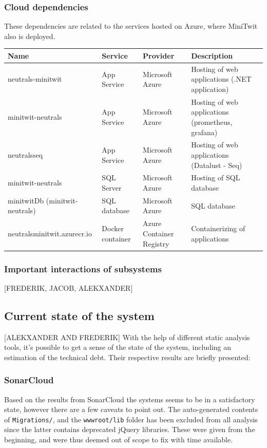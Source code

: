 \documentclass{article}
\begin{document}
\subsubsection{Cloud dependencies}
These dependencies are related to the services hosted on Azure, where MiniTwit also is deployed. 

\begin{table}[H]
\begin{tabularx}{\textwidth}{|l|l|l|X|}
\hline
    \textbf{Name} & \textbf{Service} & \textbf{Provider} & \textbf{Description} \\ \hline
    neutrals-minitwit & App Service & Microsoft Azure & Hosting of web applications (.NET application) \\ \hline
    minitwit-neutrals & App Service & Microsoft Azure & Hosting of web applications (prometheus, grafana) \\ \hline
    neutralsseq & App Service & Microsoft Azure & Hosting of web applications (Datalust - Seq) \\ \hline
    minitwit-neutrals & SQL Server & Microsoft Azure & Hosting of SQL database \\ \hline
    minitwitDb (minitwit-neutrals) & SQL database & Microsoft Azure & SQL database \\ \hline
    neutralsminitwit.azurecr.io & Docker container & Azure Container Registry & Containerizing of applications \\ \hline
\end{tabularx}
\end{table}

\subsubsection{Important interactions of subsystems} [FREDERIK, JACOB, ALEKXANDER]
\subsection{Current state of the system} 
[ALEKXANDER AND FREDERIK]
With the help of different static analysis tools, it's possible to get a sense of the state of the system, including an estimation of the technical debt. Their respective results are briefly presented:

\subsubsection*{SonarCloud}
Based on the results from SonarCloud the systems seems to be in a satisfactory state, however there are a few caveats to point out. The auto-generated contents of \texttt{Migrations/}, and the \texttt{wwwroot/lib} folder has been excluded from all analysis since the latter contains deprecated jQuery libraries. These were given from the beginning, and were thus deemed out of scope to fix with time available. 
\end{document}
